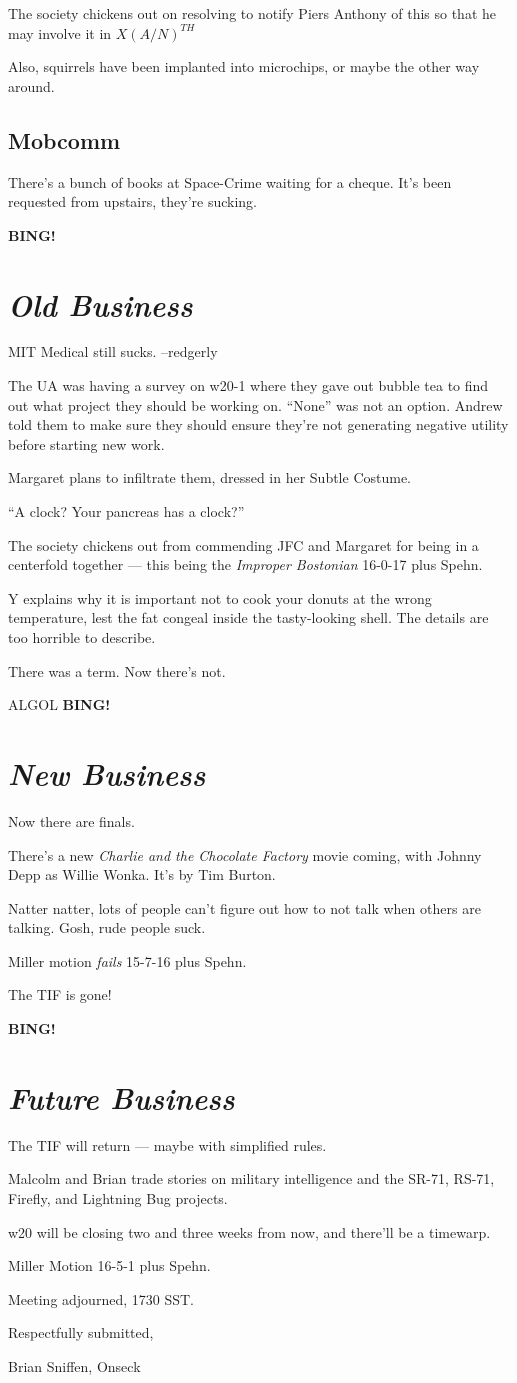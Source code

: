 \documentclass[10pt]{article}
\newcommand{\bing}{{\bf BING!} }
\newcommand{\goto}[1]{\bing \vskip 12pt \section*{{\em{#1}}}}
\newcommand{\ps}{ plus Spehn\xspace}
\begin{document}
The society chickens out on resolving to notify Piers Anthony of this
so that he may involve it in $X(A/N)^{TH}$

Also, squirrels have been implanted into microchips, or maybe the
other way around.

\subsection*{Mobcomm}
There's a bunch of books at Space-Crime waiting for a cheque.  It's
been requested from upstairs, they're sucking.

\goto{Old Business}

MIT Medical still sucks. --redgerly

The UA was having a survey on w20-1 where they gave out bubble tea to
find out what project they should be working on.  ``None'' was not an
option.  Andrew told them to make sure they should ensure they're not
generating negative utility before starting new work.

Margaret plans to infiltrate them, dressed in her Subtle Costume.

``A clock?  Your pancreas has a clock?''

The society chickens out from commending JFC and Margaret for being in
a centerfold together --- this being the \emph{Improper Bostonian}
16-0-17\ps.

Y explains why it is important not to cook your donuts at the wrong
temperature, lest the fat congeal inside the tasty-looking shell.  The
details are too horrible to describe.

There was a term.  Now there's not.

ALGOL
\goto{New Business}

Now there are finals.

There's a new \emph{Charlie and the Chocolate Factory} movie coming,
with Johnny Depp as Willie Wonka.  It's by Tim Burton.

Natter natter, lots of people can't figure out how to not talk when
others are talking.  Gosh, rude people suck.

Miller motion \emph{fails} 15-7-16\ps.

The TIF is gone!

\goto{Future Business}

The TIF will return --- maybe with simplified rules.

Malcolm and Brian trade stories on military intelligence and the
SR-71, RS-71, Firefly, and Lightning Bug projects.

w20 will be closing two and three weeks from now, and there'll be a
timewarp.

Miller Motion 16-5-1\ps.

\vspace{12pt}

\noindent
Meeting adjourned, 1730 SST.

\vspace{18pt}

\centerline{Respectfully submitted,}
\centerline{Brian Sniffen, Onseck}
\end{document}
